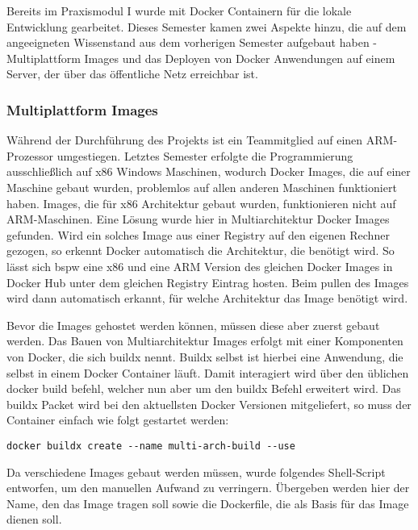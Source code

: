 Bereits im Praxismodul I wurde mit Docker Containern für die lokale Entwicklung gearbeitet.
Dieses Semester kamen zwei Aspekte hinzu, die auf dem angeeigneten Wissenstand aus dem vorherigen Semester aufgebaut haben - Multiplattform Images und das Deployen von Docker Anwendungen auf einem Server, der über das öffentliche Netz erreichbar ist.

\subsubsection{Multiplattform Images}\label{subsubsec:multiplattform-images}
Während der Durchführung des Projekts ist ein Teammitglied auf einen ARM-Prozessor umgestiegen.
Letztes Semester erfolgte die Programmierung ausschließlich auf x86 Windows Maschinen, wodurch Docker Images, die auf einer Maschine gebaut wurden, problemlos auf allen anderen Maschinen funktioniert haben.
Images, die für x86 Architektur gebaut wurden, funktionieren nicht auf ARM-Maschinen.
Eine Lösung wurde hier in Multiarchitektur Docker Images gefunden.
Wird ein solches Image aus einer Registry auf den eigenen Rechner gezogen, so erkennt Docker automatisch die Architektur, die benötigt wird.
So lässt sich bspw eine x86 und eine ARM Version des gleichen Docker Images in Docker Hub unter dem gleichen Registry Eintrag hosten.
Beim pullen des Images wird dann automatisch erkannt, für welche Architektur das Image benötigt wird.

Bevor die Images gehostet werden können, müssen diese aber zuerst gebaut werden.
Das Bauen von Multiarchitektur Images erfolgt mit einer Komponenten von Docker, die sich buildx nennt.
Buildx selbst ist hierbei eine Anwendung, die selbst in einem Docker Container läuft.
Damit interagiert wird über den üblichen docker build befehl, welcher nun aber um den buildx Befehl erweitert wird.
Das buildx Packet wird bei den aktuellsten Docker Versionen mitgeliefert, so muss der Container einfach wie folgt gestartet werden:

\lstset{language=Shell}
\begin{lstlisting}[label={lst:lst-shell-buildx-setup}]
docker buildx create --name multi-arch-build --use
\end{lstlisting}

Da verschiedene Images gebaut werden müssen, wurde folgendes Shell-Script entworfen, um den manuellen Aufwand zu verringern.
Übergeben werden hier der Name, den das Image tragen soll sowie die Dockerfile, die als Basis für das Image dienen soll.

